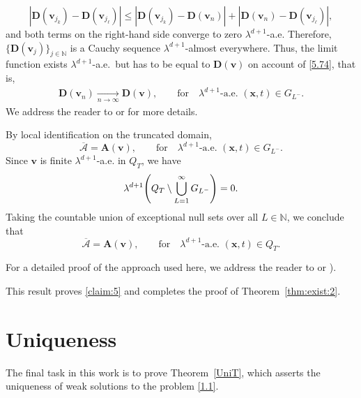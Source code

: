 \documentclass[12pt,reqno]{amsart}
\numberwithin{equation}{section}
\let\originalleft\left
\let\originalright\right
\renewcommand{\left}{\mathopen{}\mathclose\bgroup\originalleft}
\renewcommand{\right}{\aftergroup\egroup\originalright}
\theoremstyle{definition}
\def\vv{\boldsymbol{v}}
\def\N{\mathbb{N}}
\def\x{\boldsymbol{x}}
\def\bfD{\mathbf{D}}
\def\bfA{\mathbf{A}}
\def\bmcA{\boldsymbol{\mathcal{A}}}
\begin{document}
{{\begin{equation*}
|\bfD(\vv_{j_k})-\bfD(\vv_{j_\ell})|
\leq
|\bfD(\vv_{j_k})-\bfD(\vv_n)|
+
|\bfD(\vv_n)-\bfD(\vv_{j_\ell})| ,
\end{equation*}
and both terms on the right-hand side converge to zero $\lambda^{d+1}$-a.e.
Therefore, $\{\bfD(\vv_j)\}_{j\in\N}$ is a Cauchy sequence $\lambda^{d+1}$-almost everywhere.
Thus, the limit function exists $\lambda^{d+1}$-a.e.~but has to be equal to $\bfD(\vv)$ on account of \eqref{5.74}, that is,
\begin{align*}
	\bfD(\vv_n) \xrightarrow[n\to\infty]{} \bfD(\vv),\qquad \text{for}\quad \lambda^{d+1}\text{-a.e. }(\x,t)\in G_{L^-}.
\end{align*}
We address the reader to \cite[Eqn. (1.6)]{LBJMMS} or \cite{JFJMMS} for more details.

{By local identification on the truncated domain,
\begin{equation*}
\overline{\bmcA}=\bfA(\vv),\qquad \text{for}\quad \lambda^{d+1}\text{-a.e. }(\x,t)\in G_{L^-}.
\end{equation*}
Since $\vv$ is finite $\lambda^{d+1}$-a.e. in $Q_T$, we have
\begin{equation*}
\lambda^{d+1}\left(Q_T \setminus \bigcup_{L=1}^\infty G_{L^-}\right) = 0.
\end{equation*}
Taking the countable union of exceptional null sets over all $L \in \mathbb{N}$, we conclude that
\begin{equation*}
\overline{\bmcA}=\bfA(\vv),\qquad \text{for}\quad \lambda^{d+1}\text{-a.e. }(\x,t)\in Q_T.
\end{equation*}
}

For a detailed proof of the approach used here, we address the reader to \cite[Appendix A]{Wolf:2007} or \cite[pp. 324]{Breit:2015}).
}
This result proves \eqref{claim:5} and completes the proof of Theorem~\ref{thm:exist:2}.


\section{Uniqueness}\label{Sect:unique}
{The final task in this work is to prove Theorem~\ref{UniT}, which asserts the uniqueness of weak solutions to the problem \eqref{1.1}.
}

}
\end{document}
